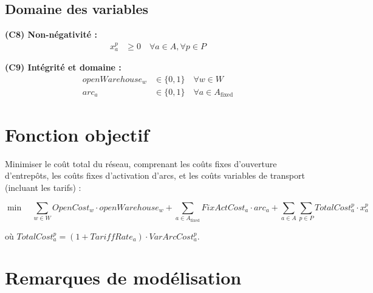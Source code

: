 \documentclass{article}
\begin{document}
\subsection{Domaine des variables}

\noindent\textbf{(C8) Non-négativité :}
\begin{align}
    x_a^p &\ge 0 \quad \forall a \in A, \forall p \in P \label{eq:flow_nonneg}
\end{align}

\noindent\textbf{(C9) Intégrité et domaine :}
\begin{align}
    openWarehouse_w &\in \{0, 1\} \quad \forall w \in W \label{eq:wh_binary}\\
    arc_a &\in \{0, 1\} \quad \forall a \in A_{\text{fixed}} \label{eq:arc_binary}
\end{align}

\section{Fonction objectif}

Minimiser le coût total du réseau, comprenant les coûts fixes d'ouverture d'entrepôts,
les coûts fixes d'activation d'arcs, et les coûts variables de transport (incluant les tarifs) :

\begin{equation}
    \min \quad
    \sum_{w \in W} OpenCost_w \cdot openWarehouse_w
    + \sum_{a \in A_{\text{fixed}}} FixActCost_a \cdot arc_a
    + \sum_{a \in A} \sum_{p \in P} TotalCost_a^p \cdot x_a^p
    \label{eq:objective}
\end{equation}

\noindent où $TotalCost_a^p = (1 + TariffRate_a) \cdot VarArcCost_a^p$.

\section{Remarques de modélisation}
\end{document}
